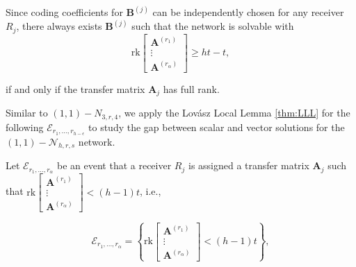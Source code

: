 Since coding coefficients for $\boldsymbol{B}^{\left(j\right)}$ can
be independently chosen for any receiver $R_{j}$, there always exists
$\boldsymbol{B}^{\left(j\right)}$ such that the network is solvable
with 
\[
\mathrm{rk}\left[\begin{array}{c}
\boldsymbol{A}^{\left(r_{1}\right)}\\
\vdots\\
\boldsymbol{A}^{\left(r_{\alpha}\right)}
\end{array}\right]\geq ht-t,
\]

if and only if the transfer matrix $\boldsymbol{A}_{j}$ has full
rank.

Similar to $\left(1,1\right)-\ensuremath{N}_{3,r,4}$, we apply the
Lov\'asz Local Lemma \ref{thm:LLL} for the following $\mathcal{E}_{r_{1},\ldots,r_{h-\epsilon}}$
to study the gap between scalar and vector solutions for the $\left(1,1\right)-\mathcal{N}_{h,r,s}$
network.

Let $\mathcal{E}_{r_{1},\ldots,r_{\alpha}}$ be an event that a receiver
$R_{j}$ is assigned a transfer matrix $\boldsymbol{A}_{j}$ such
that $\mathrm{rk}\left[\begin{array}{c}
\boldsymbol{A}^{\left(r_{1}\right)}\\
\vdots\\
\boldsymbol{A}^{\left(r_{\alpha}\right)}
\end{array}\right]<(h-1)t$, i.e.,

\[
\mathcal{E}_{r_{1},\ldots,r_{\alpha}}=\left\{ \mathrm{rk}\left[\begin{array}{c}
\boldsymbol{A}^{\left(r_{1}\right)}\\
\vdots\\
\boldsymbol{A}^{\left(r_{\alpha}\right)}
\end{array}\right]<(h-1)t\right\} ,
\]

